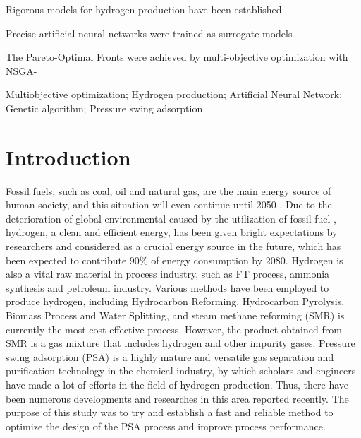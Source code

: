 \documentclass[preprint,12pt]{elsarticle}
\begin{document}
\begin{frontmatter}
		\begin{highlights}
			\item Rigorous models for hydrogen production have been established
			\item Precise artificial neural networks were trained as surrogate models
			\item The Pareto-Optimal Fronts were achieved by multi-objective optimization with NSGA-\uppercase\expandafter{}
		\end{highlights}
		
		\begin{keyword}
			Multiobjective optimization; Hydrogen production; Artificial Neural Network; Genetic algorithm; Pressure swing adsorption
		\end{keyword}
		
	\end{frontmatter}
	
	 \linenumbers
	
	\section{Introduction}
	Fossil fuels, such as coal, oil and natural gas, are the main energy source of human society, and this situation will even continue until 2050 \cite{RN1}. Due to the deterioration of global environmental caused by the utilization of fossil fuel \cite{RN2,RN3,RN4,RN5}, hydrogen, a clean and efficient energy, has been given bright expectations by researchers and considered as a crucial energy source in the future\cite{RN6,RN7,RN8,RN9}, which has been expected to contribute 90\% of energy consumption by 2080\cite{RN10}. Hydrogen is also a vital raw material in process industry, such as FT process\cite{RN11}, ammonia synthesis\cite{RN12} and petroleum industry\cite{RN13}. Various methods have been employed to produce hydrogen, including Hydrocarbon Reforming, Hydrocarbon Pyrolysis, Biomass Process and Water Splitting\cite{RN14}, and steam methane reforming (SMR) is currently the most cost-effective process\cite{RN15}. However, the product obtained from SMR is a gas mixture that includes hydrogen and other impurity gases. Pressure swing adsorption (PSA) is a highly mature and versatile gas separation and purification technology in the chemical industry\cite{RN16,RN17,RN18}, by which scholars and engineers have made a lot of efforts in the field of hydrogen production. Thus, there have been numerous developments and researches in this area reported recently\cite{RN8,RN19,RN20,RN21,RN22}. The purpose of this study was to try and establish a fast and reliable method to optimize the design of the PSA process and improve process performance.
	
\end{document}
